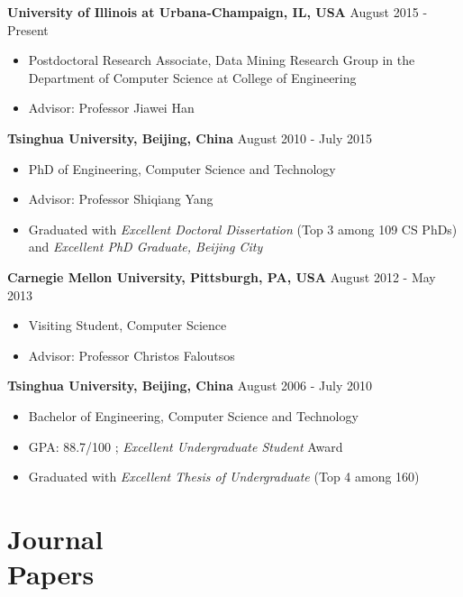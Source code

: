 \documentclass[margin, 10pt]{res} %
\begin{document}
\begin{resume}
{\bf University of Illinois at Urbana-Champaign, IL, USA} \hfill {August 2015 - Present}
\begin{itemize} \itemsep -2pt %
	\item Postdoctoral Research Associate, Data Mining Research Group in the Department of Computer Science at College of Engineering
	\item Advisor: Professor Jiawei Han
\end{itemize}

{\bf Tsinghua University, Beijing, China} \hfill {August 2010 - July 2015}
\begin{itemize} \itemsep -2pt %
\item PhD of Engineering, Computer Science and Technology
\item Advisor: Professor Shiqiang Yang
\item Graduated with {\em Excellent Doctoral Dissertation} (Top 3 among 109 CS PhDs)
	and {\em Excellent PhD Graduate, Beijing City}
\end{itemize}

{\bf Carnegie Mellon University, Pittsburgh, PA, USA} \hfill {August 2012 - May 2013}
\begin{itemize} \itemsep -2pt %
\item Visiting Student, Computer Science
\item Advisor: Professor Christos Faloutsos
\end{itemize}

{\bf Tsinghua University, Beijing, China} \hfill {August 2006 - July 2010}
\begin{itemize} \itemsep -2pt %
\item Bachelor of Engineering, Computer Science and Technology
\item GPA: 88.7/100 %
	; {\em Excellent Undergraduate Student} Award
\item Graduated with {\em Excellent Thesis of Undergraduate} (Top 4 among 160)
\end{itemize}


\section{Journal \\ Papers}


\end{resume}
\end{document}

